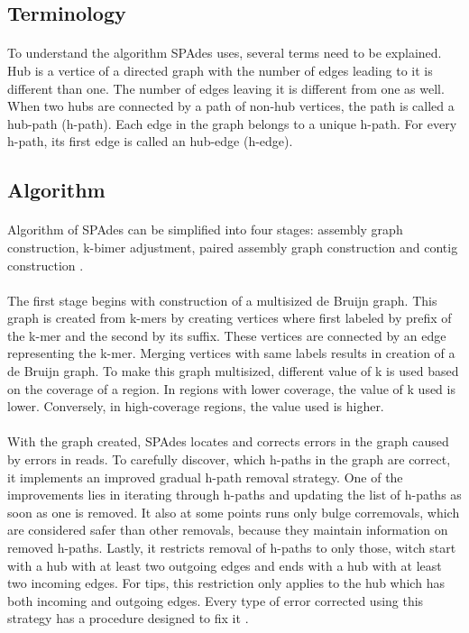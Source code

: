 \subsection{Terminology}
\paragraph*{}
To understand the algorithm SPAdes uses, several terms need to be explained. Hub is a vertice of a directed graph with the number of edges leading to it is different than one. The number of edges leaving it is different from one as well. When two hubs are connected by a path of non-hub vertices, the path is called a hub-path (h-path). Each edge in the graph belongs to a unique h-path. For every h-path, its first edge is called an hub-edge (h-edge).

\subsection{Algorithm}
\paragraph*{}
Algorithm of SPAdes can be simplified into four stages: assembly graph construction, k-bimer adjustment, paired assembly graph construction and contig construction \cite{bankevich2012spades}. 
\paragraph*{}
The first stage begins with construction of a multisized de Bruijn graph. This graph is created from k-mers by creating vertices where first labeled by prefix of the k-mer and the second by its suffix. These vertices are connected by an edge representing the k-mer. Merging vertices with same labels results in creation of a de Bruijn graph. To make this graph multisized, different value of k is used based on the coverage of a region. In regions with lower coverage, the value of k used is lower. Conversely, in high-coverage regions, the value used is higher. 
\paragraph*{}
With the graph created, SPAdes locates and corrects errors in the graph caused by errors in reads. To carefully discover, which h-paths in the graph are correct, it implements an improved gradual h-path removal strategy. One of the improvements lies in iterating through h-paths and updating the list of h-paths as soon as one is removed. It also at some points runs only bulge corremovals, which are considered safer than other removals, because they maintain information on removed h-paths. Lastly, it restricts removal of h-paths to only those, witch start with a hub with at least two outgoing edges and ends with a hub with at least two incoming edges. For tips, this restriction only applies to the hub which has both incoming and outgoing edges. Every type of error corrected using this strategy has a procedure designed to fix it \cite{bankevich2012spades}.

